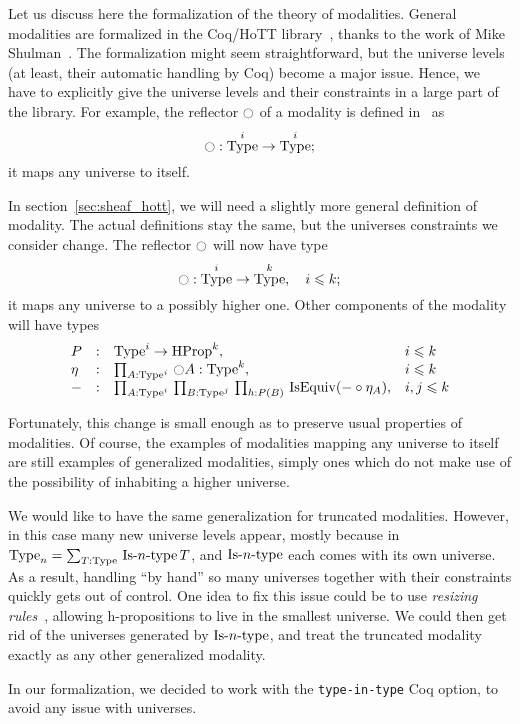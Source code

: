 \documentclass[notfinal]{jfrarticle}
\DeclareMathOperator{\Type}{Type}
\DeclareMathOperator{\HProp}{HProp}
\DeclareMathOperator{\IsEquiv}{IsEquiv}
\def\mymathhyphen{{\hbox{-}}}
\newcommand{\IsType}[1]
{\mathop{\mathrm{Is\mymathhyphen}#1\mathrm{\mymathhyphen type}} }
\newcommand{\modal}{\ensuremath{\ocircle}}
\newcommand{\sumD}[3]{\sum_{#1:#2}\, #3}
\newcommand{\prodD}[3]{\prod_{#1:#2}\, #3}
\newcommand{\code}[1]{\texttt{#1}}
\begin{document}
Let us discuss here the formalization of the theory of
modalities. General modalities are formalized in the Coq/HoTT
library~\cite{hottlib}, thanks to the work of Mike
Shulman~\cite{modules-modalities}. The formalization might seem
straightforward, but the universe levels (at least, their automatic
handling by Coq) become a major issue. Hence, we have to explicitly
give the universe levels and their constraints in a large part of the
library. For example, the reflector $\modal$ of a modality is defined
in~\cite{hottlib} as
\[ \modal : \Type^i \to \Type^i ;\]
it maps any universe to itself.

In section~\ref{sec:sheaf_hott}, we will need a slightly more general
definition of modality. The actual definitions stay the same, but the
universes constraints we consider change. The reflector $\modal$ will
now have type
\[ \modal : \Type^i \to \Type^k,\quad i \leqslant k ;\]
it maps any universe to a possibly higher one.
Other components of the modality will have types
\[\begin{array}{llll}
  P &:& \Type^i \to \HProp^k, & i\leqslant k \\
  \eta &:& \prodD A {\Type^i} {\modal A : \Type^{k}}, & i \leqslant k\\
  - &:& \prodD A {\Type^i} {
          \prodD B {\Type^j} {
          \prodD h {P(B)} {
          \IsEquiv ( - \circ \eta_A)
          }}}, & i,j \leqslant k
\end{array}\]

Fortunately, this change is small enough as to preserve usual properties of
modalities. Of course, the examples of modalities mapping
any universe to itself are still examples of generalized modalities,
simply ones which do not make use of the possibility of inhabiting a higher
universe. 

We would like to have the same generalization for truncated
modalities. However, in this case many new universe levels appear,
mostly because in $\Type_n = \sumD T \Type {\IsType n T}$, and $\IsType n$
each comes with its own universe. As a result, handling ``by hand'' so many
universes together with their constraints quickly gets out of
control. One idea to fix this issue could be to use {\em resizing
  rules}~\cite{vv-resizing}, allowing h-propositions to live in the
smallest universe. We could then get rid of the universes generated by
$\IsType n$, and treat the truncated modality exactly as any other generalized
modality.

In our formalization, we decided to work with the \code{type-in-type}
Coq option, to avoid any issue with universes.
\end{document}
